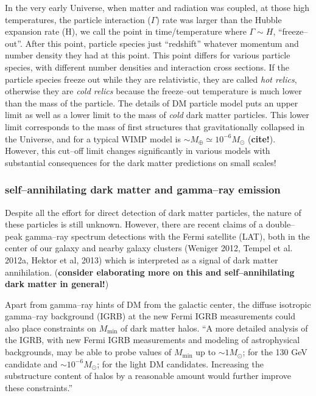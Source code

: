 \documentclass[paper=a4, fontsize=11pt]{scrartcl} %
\numberwithin{equation}{section} %
\numberwithin{figure}{section} %
\numberwithin{table}{section} %
\begin{document}
In the very early Universe, when matter and radiation was coupled, at those high temperatures, the particle interaction ($\Gamma$) rate was larger than the Hubble expansion rate (H), we call the point in time/temperature where $\Gamma \sim H$, ``freeze--out''. After this point, particle species just ``redshift'' whatever momentum and number density they had at this point. This point differs for various particle species, with different number densities and interaction cross sections. If the particle species freeze out while they are relativistic, they are called \emph{hot relics}, otherwise they are \emph{cold relics} because the freeze--out temperature is much lower than the mass of the particle. The details of DM particle model puts an upper limit as well as a lower limit to the mass of \emph{cold} dark matter particles. This lower limit corresponds to the mass of first structures that gravitationally collapsed in the Universe, and for a typical WIMP model is $\sim M_\oplus \simeq 10^{-6} M_\odot$ ({\bf cite!}). However, this cut--off limit changes significantly in various models with substantial consequences for the dark matter predictions on small scales! 

\subsubsection{self--annihilating dark matter and gamma--ray emission}

Despite all the effort for direct detection of dark matter particles, the nature of these particles is still unknown. However, there are recent claims of a double--peak gamma--ray spectrum detections with the Fermi satellite (LAT), both in the center of our galaxy and nearby galaxy clusters (Weniger 2012, Tempel et al. 2012a, Hektor et al, 2013) which is interpreted as a signal of dark matter annihilation. ({\bf consider elaborating more on this and self--annihilating dark matter in general!})

Apart from gamma--ray hints of DM from the galactic center, the diffuse isotropic gamma--ray background (IGRB) at the new Fermi IGRB measurements could also place constraints on $M_\mathrm{min}$ of dark matter halos. ``A more detailed analysis of the IGRB, with new Fermi IGRB measurements and modeling of astrophysical backgrounds, may be able to probe values of $M_\mathrm{min}$ up to $\sim 1 M_\odot$; for the 130 GeV candidate and $\sim 10^{-6} M_\odot$; for the light DM candidates. Increasing the substructure content of halos by a reasonable amount would further improve these constraints.'' %
\end{document}
